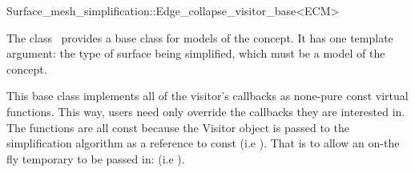 
\begin{ccRefClass}{Surface_mesh_simplification::Edge_collapse_visitor_base<ECM>}


\ccDefinition

The class \ccRefName\ provides a base class for models of the  concept.
It has one template argument: the type of surface being simplified,
which must be a model of the  concept.

This base class implements all of the visitor's callbacks as none-pure const virtual functions. 
This way, users need only override the callbacks they are interested in.
The functions are all const because the Visitor object is passed to the simplification algorithm as 
a reference to const (i.e ). 
That is to allow an on-the fly temporary to be passed in:  (i.e  ).


\ccIsModel
{}

  
\end{ccRefClass}

